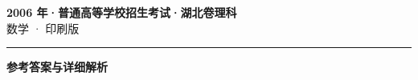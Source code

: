 \documentclass[zihao=5, a4paper]{ctexart}
\begin{document}
\begin{center}
  {\Large\bfseries 2006 年·普通高等学校招生考试·湖北卷理科}\\[4pt]
  {\large 数学 · 印刷版}
\end{center}
\medskip
{}

\par\bigskip\hrule\bigskip
{}
\begin{center}{\large\bfseries 参考答案与详细解析}\end{center}
\smallskip

\end{document}
